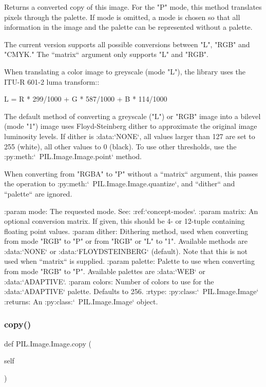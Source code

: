 \begin{DoxyVerb}Returns a converted copy of this image. For the "P" mode, this
method translates pixels through the palette.  If mode is
omitted, a mode is chosen so that all information in the image
and the palette can be represented without a palette.

The current version supports all possible conversions between
"L", "RGB" and "CMYK." The ``matrix`` argument only supports "L"
and "RGB".

When translating a color image to greyscale (mode "L"),
the library uses the ITU-R 601-2 luma transform::

    L = R * 299/1000 + G * 587/1000 + B * 114/1000

The default method of converting a greyscale ("L") or "RGB"
image into a bilevel (mode "1") image uses Floyd-Steinberg
dither to approximate the original image luminosity levels. If
dither is :data:`NONE`, all values larger than 127 are set to 255 (white),
all other values to 0 (black). To use other thresholds, use the
:py:meth:`~PIL.Image.Image.point` method.

When converting from "RGBA" to "P" without a ``matrix`` argument,
this passes the operation to :py:meth:`~PIL.Image.Image.quantize`,
and ``dither`` and ``palette`` are ignored.

:param mode: The requested mode. See: :ref:`concept-modes`.
:param matrix: An optional conversion matrix.  If given, this
   should be 4- or 12-tuple containing floating point values.
:param dither: Dithering method, used when converting from
   mode "RGB" to "P" or from "RGB" or "L" to "1".
   Available methods are :data:`NONE` or :data:`FLOYDSTEINBERG` (default).
   Note that this is not used when ``matrix`` is supplied.
:param palette: Palette to use when converting from mode "RGB"
   to "P".  Available palettes are :data:`WEB` or :data:`ADAPTIVE`.
:param colors: Number of colors to use for the :data:`ADAPTIVE` palette.
   Defaults to 256.
:rtype: :py:class:`~PIL.Image.Image`
:returns: An :py:class:`~PIL.Image.Image` object.
\end{DoxyVerb}
 \mbox{\label{classPIL_1_1Image_1_1Image_acb0efebbea61d4b249451fbd4537b029}} 
\subsubsection{\texorpdfstring{copy()}{copy()}}
{\footnotesize\ttfamily def P\+I\+L.\+Image.\+Image.\+copy (\begin{DoxyParamCaption}\item[{}]{self }\end{DoxyParamCaption})}


